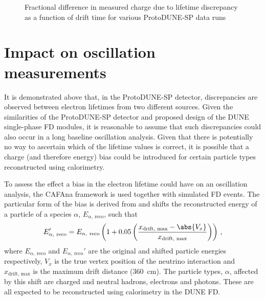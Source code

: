 \begin{figure}[h]
	\begin{adjustbox}{max totalsize=.6\linewidth, center}
		
	\end{adjustbox}
	\caption[Fractional difference in measured charge due to lifetime discrepancy as a function of drift time]{Fractional difference in measured charge due to lifetime discrepancy as a function of drift time for various ProtoDUNE-SP data runs}
	\label{fig:chargeEquivalent}
\end{figure}

\section{Impact on oscillation measurements}
\label{sec:pdune_calibration:osc}

It is demonstrated above that, in the ProtoDUNE-SP detector, discrepancies are observed between electron lifetimes from two different sources. 
Given the similarities of the ProtoDUNE-SP detector and proposed design of the DUNE single-phase FD modules, it is reasonable to assume that such discrepancies could also occur in a long baseline oscillation analysis.  
Given that there is potentially no way to ascertain which of the lifetime values is correct, it is possible that a charge (and therefore energy) bias could be introduced for certain particle types reconstructed using calorimetry.

To assess the effect a bias in the electron lifetime could have on an oscillation analysis, the CAFAna framework is used together with simulated FD events.
The particular form of the bias is derived from  and shifts the reconstructed energy of a particle of a species $\alpha$, $E_{\alpha,~\text{reco}}$, such that
\begin{equation}
	E_{\alpha,~\text{reco}}' = E_{\alpha,~\text{reco}} \left( 1 + 0.05 \left( \frac{ x_{\text{drift, max}} - \abs{V_{x}} }{ x_{\text{drift, max}} } \right) \right) \, ,
\end{equation}
where $E_{\alpha,~\text{reco}}$ and $E_{\alpha,~\text{reco}}'$ are the original and shifted particle energies respectively, $V_{x}$ is the true vertex position of the neutrino interaction and $x_{\text{drift, max}}$ is the maximum drift distance (\SI{360}{\cm}).
The particle types, $\alpha$, affected by this shift are charged and neutral hadrons, electrons and photons.
These are all expected to be reconstructed using calorimetry in the DUNE FD.

